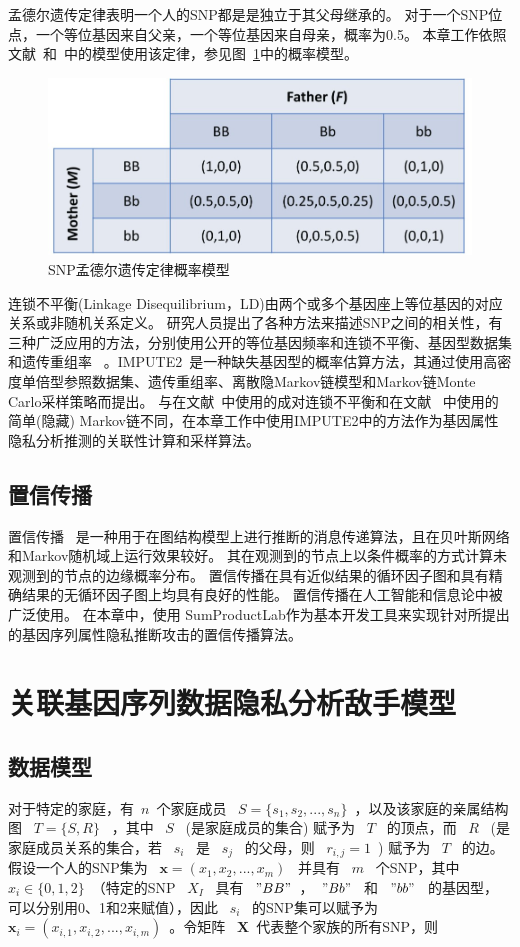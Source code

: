 孟德尔遗传定律表明一个人的SNP都是是独立于其父母继承的。 对于一个SNP位点，一个等位基因来自父亲，一个等位基因来自母亲，概率为0.5。 本章工作依照文献~\cite{humbert2013addressing}和~\cite{deznabi2018inference}中的模型使用该定律，参见图~\ref{fig:Mendelian-law}中的概率模型。

\begin{figure}[htbp]
	\centering
	\includegraphics[width=0.6\linewidth]{./figures/Mendelian-law.jpg}
	\centering
	\caption{SNP孟德尔遗传定律概率模型}\label{fig:Mendelian-law}
\end{figure}

连锁不平衡(Linkage Disequilibrium，LD)由两个或多个基因座上等位基因的对应关系或非随机关系定义。 研究人员提出了各种方法来描述SNP之间的相关性，有三种广泛应用的方法，分别使用公开的等位基因频率和连锁不平衡、基因型数据集和遗传重组率~\cite{samani2015quantifying} 。IMPUTE2~\cite{howie2014impute2}是一种缺失基因型的概率估算方法，其通过使用高密度单倍型参照数据集、遗传重组率、离散隐Markov链模型和Markov链Monte Carlo采样策略而提出。 与在文献~\cite{humbert2013addressing,humbert2017quantifying}中使用的成对连锁不平衡和在文献~\cite{deznabi2018inference} 中使用的简单(隐藏) Markov链不同，在本章工作中使用IMPUTE2中的方法作为基因属性隐私分析推测的关联性计算和采样算法。

\subsection{置信传播}

置信传播~\cite{kschischang2001factor} 是一种用于在图结构模型上进行推断的消息传递算法，且在贝叶斯网络和Markov随机域上运行效果较好。 其在观测到的节点上以条件概率的方式计算未观测到的节点的边缘概率分布。 置信传播在具有近似结果的循环因子图和具有精确结果的无循环因子图上均具有良好的性能。 置信传播在人工智能和信息论中被广泛使用。 在本章中，使用 SumProductLab作为基本开发工具来实现针对所提出的基因序列属性隐私推断攻击的置信传播算法。

\section{关联基因序列数据隐私分析敌手模型}
\subsection{数据模型}
对于特定的家庭，有~$n$~个家庭成员 ~$S=\{s_1,s_2,...,s_n\}$~，以及该家庭的亲属结构图 ~$T=\{S,R\}$~ ，其中 ~$S$~ (是家庭成员的集合) 赋予为 ~$T$~ 的顶点，而 ~$R$~ (是家庭成员关系的集合，若 ~$s_i$~ 是 ~$s_j$~ 的父母，则 ~$r_{i,j}=1$~) 赋予为 ~$T$~ 的边。 假设一个人的SNP集为 ~$\mathbf{x}=(x_1,x_2,...,x_m)$~ 并具有 ~$m$~ 个SNP，其中 ~$x_i \in \{0,1,2\}$~（特定的SNP ~$X_I$~ 具有 ~$"BB"$~，~$"Bb"$~ 和 ~$"bb"$~ 的基因型，可以分别用0、1和2来赋值），因此 ~$s_i$~ 的SNP集可以赋予为 ~$\mathbf{x}_i=(x_{i,1},x_{i,2},...,x_{i,m})$~。令矩阵 ~$\mathbf{X}$~代表整个家族的所有SNP，则

